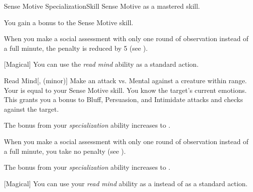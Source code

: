     \begin{feat}{Sense Motive Specialization}{Skill}
        \featpre Sense Motive as a mastered skill.

         You gain a  bonus to the Sense Motive skill.

         When you make a social assessment with only one round of observation instead of a full minute, the penalty is reduced by 5 (see ).

        [Magical] You can use the \textit{read mind} ability as a standard action.
        \begin{apability}{Read Mind}[,  (minor)]
            Make an attack vs. Mental against a creature within \rngclose range.
            Your  is equal to your Sense Motive skill.
            \hit You know the target's current emotions.
            This grants you a  bonus to Bluff, Persuasion, and Intimidate attacks and checks against the target.
        \end{apability}

         The bonus from your \textit{specialization} ability increases to .

         When you make a social assessment with only one round of observation instead of a full minute, you take no penalty (see ).

         The bonus from your \textit{specialization} ability increases to .

        [Magical] You can use your \textit{read mind} ability as a  instead of as a standard action.
    \end{feat}

